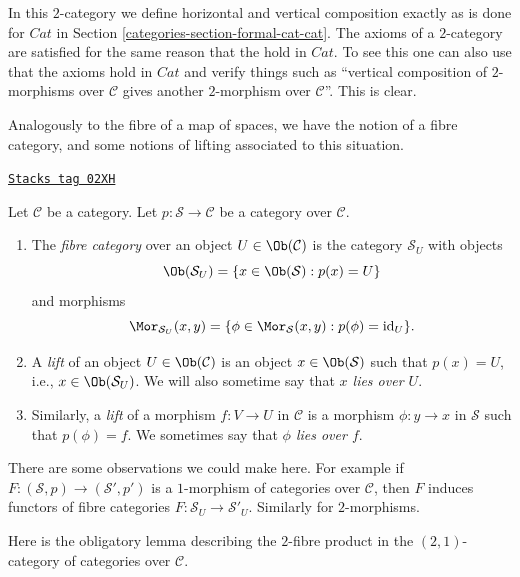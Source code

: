 In this $2$-category we define horizontal and vertical composition
exactly as is done for $\textit{Cat}$ in Section \ref{categories-section-formal-cat-cat}.
The axioms of a $2$-category are satisfied for the same reason
that the hold in $\textit{Cat}$. To see this one can also use that
the axioms hold in $\textit{Cat}$ and verify
things such as ``vertical composition of $2$-morphisms over $\mathcal{C}$
gives another $2$-morphism over $\mathcal{C}$''. This is clear.

\medskip\noindent
Analogously to the fibre of a map of spaces, we have the notion of a
fibre category, and some notions of lifting associated to this
situation.

\begin{definition}
\label{categories-definition-fibre-category}
\href{https://stacks.math.columbia.edu/tag/02XH}{\texttt{Stacks tag 02XH}}

Let $\mathcal{C}$ be a category.
Let $p : \mathcal{S} \to \mathcal{C}$ be a category over $\mathcal{C}$.
\begin{enumerate}
\item The {\it fibre category} over an object $U\in \Ob(\mathcal{C})$
is the category $\mathcal{S}_U$ with objects
$$
\Ob(\mathcal{S}_U) = \{x\in \Ob(\mathcal{S}) :
p(x) = U\}
$$
and morphisms
$$
\Mor_{\mathcal{S}_U}(x, y) = \{ \phi \in \Mor_\mathcal{S}(x, y) :
p(\phi) = \text{id}_U\}.
$$
\item A {\it lift} of an object $U \in \Ob(\mathcal{C})$
is an object $x\in \Ob(\mathcal{S})$ such that $p(x) = U$, i.e.,
$x\in \Ob(\mathcal{S}_U)$. We will also sometime say
that {\it $x$ lies over $U$}.
\item Similarly, a {\it lift} of a morphism $f : V \to U$ in $\mathcal{C}$
is a morphism $\phi : y \to x$ in $\mathcal{S}$ such that $p(\phi) = f$.
We sometimes say that {\it $\phi$ lies over $f$}.
\end{enumerate}
\end{definition}

There are some observations we could make here. For example if
$F : (\mathcal{S}, p) \to (\mathcal{S}', p')$ is a $1$-morphism
of categories over $\mathcal{C}$, then $F$ induces functors
of fibre categories $F : \mathcal{S}_U \to \mathcal{S}'_U$.
Similarly for $2$-morphisms.

\medskip\noindent
Here is the obligatory lemma describing the $2$-fibre product in the
$(2, 1)$-category of categories over $\mathcal{C}$.

